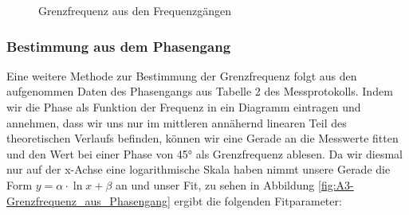 \documentclass{article}
\begin{document}
\begin{figure}[!hp]
  \centering
  \hfill
  \hfill
  \caption{Grenzfrequenz aus den Frequenzgängen}
  \label{fig:A3-Grenzfrequenz_aus_Frequenzgängen}
\end{figure}





\clearpage
\newpage

\subsubsection{Bestimmung aus dem Phasengang}

Eine weitere Methode zur Bestimmung der Grenzfrequenz folgt aus den aufgenommen Daten des Phasengangs aus Tabelle 2 des Messprotokolls. Indem wir die Phase als Funktion der Frequenz in ein Diagramm eintragen und annehmen, dass wir uns nur im mittleren annähernd linearen Teil des theoretischen Verlaufs befinden, können wir eine Gerade an die Messwerte fitten und den Wert bei einer Phase von 45° als Grenzfrequenz ablesen. Da wir diesmal nur auf der x-Achse eine logarithmische Skala haben nimmt unsere Gerade die Form $y = \alpha \cdot \ln{x} + \beta$ an und unser Fit, zu sehen in Abbildung \ref{fig:A3-Grenzfrequenz_aus_Phasengang} ergibt die folgenden Fitparameter:
\end{document}
